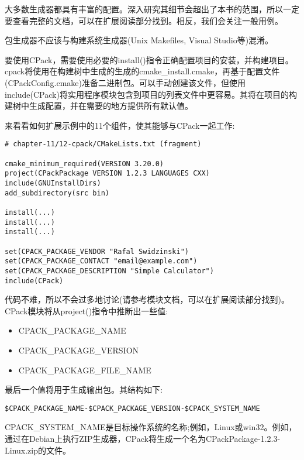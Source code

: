 大多数生成器都具有丰富的配置。深入研究其细节会超出了本书的范围，所以一定要查看完整的文档，可以在扩展阅读部分找到。相反，我们会关注一般用例。

\begin{tcolorbox}[colback=blue!5!white,colframe=blue!75!black,title=Note]
包生成器不应该与构建系统生成器(Unix Makefiles, Visual Studio等)混淆。
\end{tcolorbox}

要使用CPack，需要使用必要的install()指令正确配置项目的安装，并构建项目。cpack将使用在构建树中生成的生成的cmake\_install.cmake，再基于配置文件(CPackConfig.cmake)准备二进制包。可以手动创建该文件，但使用include(CPack)将实用程序模块包含到项目的列表文件中更容易。其将在项目的构建树中生成配置，并在需要的地方提供所有默认值。

来看看如何扩展示例中的11个组件，使其能够与CPack一起工作:

\begin{lstlisting}[style=styleCMake]
# chapter-11/12-cpack/CMakeLists.txt (fragment)

cmake_minimum_required(VERSION 3.20.0)
project(CPackPackage VERSION 1.2.3 LANGUAGES CXX)
include(GNUInstallDirs)
add_subdirectory(src bin)

install(...)
install(...)
install(...)

set(CPACK_PACKAGE_VENDOR "Rafal Swidzinski")
set(CPACK_PACKAGE_CONTACT "email@example.com")
set(CPACK_PACKAGE_DESCRIPTION "Simple Calculator")
include(CPack)
\end{lstlisting}

代码不难，所以不会过多地讨论(请参考模块文档，可以在扩展阅读部分找到)。CPack模块将从project()指令中推断出一些值:

\begin{itemize}
\item 
CPACK\_PACKAGE\_NAME

\item 
CPACK\_PACKAGE\_VERSION

\item 
CPACK\_PACKAGE\_FILE\_NAME
\end{itemize}

最后一个值将用于生成输出包。其结构如下:

\begin{lstlisting}[style=styleCMake]
$CPACK_PACKAGE_NAME-$CPACK_PACKAGE_VERSION-$CPACK_SYSTEM_NAME
\end{lstlisting}

CPACK\_SYSTEM\_NAME是目标操作系统的名称;例如，Linux或win32。例如，通过在Debian上执行ZIP生成器，CPack将生成一个名为CPackPackage-1.2.3-Linux.zip的文件。

